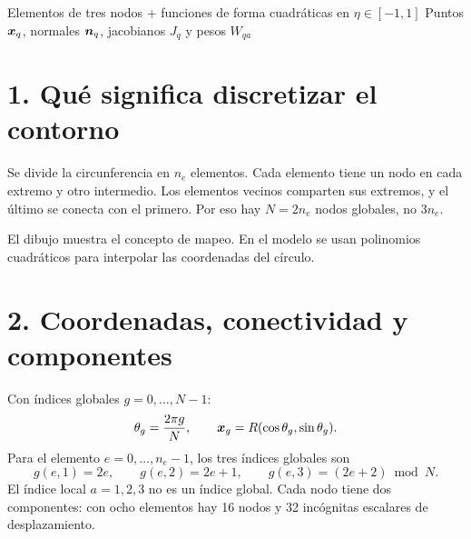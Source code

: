 \documentclass[11pt]{article}
\begin{document}
\base

{Elementos de tres nodos + funciones de forma cuadráticas en \(\eta\in[-1,1]\)}
{Puntos \(\bm{x}_q\), normales \(\bm{n}_q\), jacobianos \(J_q\) y pesos \(W_{qa}\)}

\section*{1. Qué significa discretizar el contorno}
Se divide la circunferencia en \(n_e\) elementos. Cada elemento tiene un nodo
en cada extremo y otro intermedio. Los elementos vecinos comparten sus
extremos, y el último se conecta con el primero.
Por eso hay \(N=2n_e\) nodos globales, no \(3n_e\).

\begin{center}
\end{center}
El dibujo muestra el concepto de mapeo. En el modelo se usan polinomios
cuadráticos para interpolar las coordenadas del círculo.

\section*{2. Coordenadas, conectividad y componentes}
Con índices globales \(g=0,\ldots,N-1\):
\[
 \theta_g=\frac{2\pi g}{N},\qquad
 \bm{x}_g=R(\cos\theta_g,\sin\theta_g).
\]
Para el elemento \(e=0,\ldots,n_e-1\), los tres índices globales son
\[
 g(e,1)=2e,\qquad g(e,2)=2e+1,\qquad
 g(e,3)=(2e+2)\bmod N.
\]
El índice local \(a=1,2,3\) no es un índice global.
Cada nodo tiene dos componentes: con ocho elementos hay 16 nodos y
32 incógnitas escalares de desplazamiento.
\end{document}
